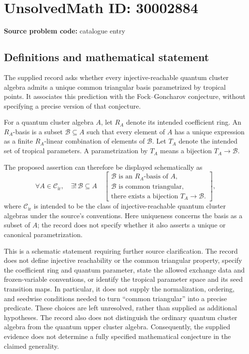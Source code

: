 \documentclass[11pt]{article}
\begin{document}
\section*{UnsolvedMath ID: 30002884}
\textbf{Source problem code:} catalogue entry
\subsection{Definitions and mathematical statement}
The supplied record asks whether every injective-reachable quantum cluster algebra admits a unique common triangular basis parametrized by tropical points. It associates this prediction with the Fock--Goncharov conjecture, without specifying a precise version of that conjecture.

For a quantum cluster algebra \(A\), let \(R_A\) denote its intended coefficient ring. An \(R_A\)-basis is a subset \(\mathcal B\subseteq A\) such that every element of \(A\) has a unique expression as a finite \(R_A\)-linear combination of elements of \(\mathcal B\). Let \(T_A\) denote the intended set of tropical parameters. A parametrization by \(T_A\) means a bijection \(T_A\to\mathcal B\).

The proposed assertion can therefore be displayed schematically as
\[
\forall A\in\mathscr C_{\mathrm{ir}},\quad
\exists!\,\mathcal B\subseteq A\quad
\left[
\begin{gathered}
\mathcal B\text{ is an }R_A\text{-basis of }A,\\
\mathcal B\text{ is common triangular},\\
\text{there exists a bijection }T_A\longrightarrow\mathcal B.
\end{gathered}
\right],
\]
where \(\mathscr C_{\mathrm{ir}}\) is intended to be the class of injective-reachable quantum cluster algebras under the source's conventions. Here uniqueness concerns the basis as a subset of \(A\); the record does not specify whether it also asserts a unique or canonical parametrization.

This is a schematic statement requiring further source clarification. The record does not define injective reachability or the common triangular property, specify the coefficient ring and quantum parameter, state the allowed exchange data and frozen-variable conventions, or identify the tropical parameter space and its seed transition maps. In particular, it does not supply the normalization, ordering, and seedwise conditions needed to turn ``common triangular'' into a precise predicate. These choices are left unresolved, rather than supplied as additional hypotheses. The record also does not distinguish the ordinary quantum cluster algebra from the quantum upper cluster algebra. Consequently, the supplied evidence does not determine a fully specified mathematical conjecture in the claimed generality.
\end{document}
